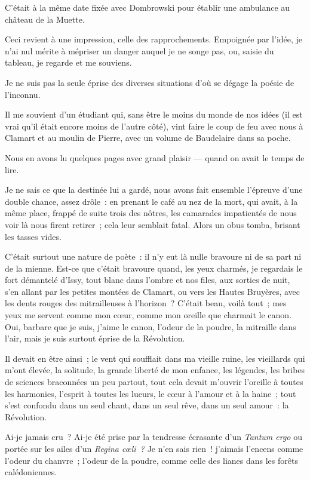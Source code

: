 \documentclass[french,twoside]{book} %
\begin{document}
C’était à la même date fixée avec Dombrowski  pour établir une ambulance au château de la Muette.\par
Ceci revient à une impression, celle des rapprochements. Empoignée par l’idée, je n’ai nul mérite à mépriser un danger auquel je ne songe pas, ou, saisie du tableau, je regarde et me souviens.\par
Je ne suis pas la seule éprise des diverses situations d’où se dégage la poésie de l’inconnu.\par
Il me souvient d’un étudiant qui, sans être le moins du monde de nos idées (il est vrai qu’il était encore moins de l’autre côté), vint faire le coup de feu avec nous à Clamart et au moulin de Pierre, avec un volume de Baudelaire dans sa poche.\par
Nous en avons lu quelques pages avec grand plaisir — quand on avait le temps de lire.\par
Je ne sais ce que la destinée lui a gardé, nous avons fait ensemble l’épreuve d’une double chance, assez drôle : en prenant le café au nez de la mort, qui avait, à la même place, frappé de suite trois des nôtres, les camarades impatientés de nous voir là nous firent retirer ; cela leur semblait fatal. Alors un obus tomba, brisant les tasses vides.\par
C’était surtout une nature de poète : il n’y eut là nulle bravoure ni de sa part ni de la mienne. Est-ce que c’était bravoure quand, les yeux charmés, je regardais le fort démantelé d’Issy,  tout blanc dans l’ombre et nos files, aux sorties de nuit, s’en allant par les petites montées de Clamart, ou vers les Hautes Bruyères, avec les dents rouges des mitrailleuses à l’horizon ? C’était beau, voilà tout ; mes yeux me servent comme mon cœur, comme mon oreille que charmait le canon. Oui, barbare que je suis, j’aime le canon, l’odeur de la poudre, la mitraille dans l’air, mais je suis surtout éprise de la Révolution.\par
Il devait en être ainsi ; le vent qui soufflait dans ma vieille ruine, les vieillards qui m’ont élevée, la solitude, la grande liberté de mon enfance, les légendes, les bribes de sciences braconnées un peu partout, tout cela devait m’ouvrir l’oreille à toutes les harmonies, l’esprit à toutes les lueurs, le cœur à l’amour et à la haine ; tout s’est confondu dans un seul chant, dans un seul rêve, dans un seul amour : la Révolution.\par
Ai-je jamais cru ? Ai-je été prise par la tendresse écrasante d’un \emph{Tantum ergo} ou portée sur les ailes d’un \emph{Regina cœli ?} Je n’en sais rien ! j’aimais l’encens comme l’odeur du chanvre ; l’odeur de la poudre, comme celle des lianes dans les forêts calédoniennes.\par
\end{document}
